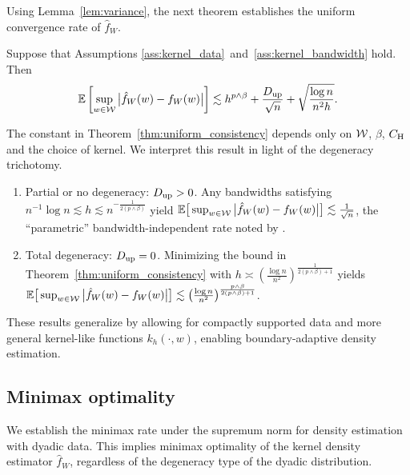 Using Lemma~\ref{lem:variance},
the next theorem establishes the uniform
convergence rate of $\hat{f}_W$.
%
\begin{theorem}%
  \label{thm:uniform_consistency}%
  Suppose that Assumptions
  \ref{ass:kernel_data}~and~\ref{ass:kernel_bandwidth}
  hold. Then
  \begin{align*}
    \mathbb{E}\left[
      \sup_{w \in \mathcal{W}}
      \big|\hat{f}_W(w) - f_W(w)\big|
    \right]
    \lesssim
    h^{p\wedge\beta}
    + \frac{D_{\textup{up}}}{\sqrt n}
    + \sqrt{\frac{\log n}{n^2h}}.
  \end{align*}
\end{theorem}
%
The constant in Theorem~\ref{thm:uniform_consistency}
depends only on $\mathcal{W}$, $\beta$, $C_{\mathrm{H}}$
and the choice of kernel.
We interpret this result in light of the degeneracy trichotomy.
\begin{enumerate}[label=(\roman*)]\onehalfspacing
  \item Partial or no degeneracy:
    $D_{\textup{up}} > 0$.
    Any bandwidths satisfying
    $n^{-1} \log n \lesssim h \lesssim n^{-\frac{1}{2(p\wedge\beta)}}$
    yield
    $\mathbb{E}\big[\sup_{w \in \mathcal{W}}\big|\hat f_W(w)
    - f_W(w)\big| \big] \lesssim \frac{1}{\sqrt n}$,
    the ``parametric'' bandwidth-independent rate noted by
    \citet{graham2022kernel}.

  \item Total degeneracy:
    $D_{\textup{up}} = 0$.
    Minimizing the bound in
    Theorem~\ref{thm:uniform_consistency} with
    $h \asymp \left( \frac{\log n}{n^2} \right)^{\frac{1}{2(p\wedge\beta)+1}}$
    yields
    $\mathbb{E}\big[ \sup_{w \in \mathcal{W}} \big|\hat f_W(w) - f_W(w)\big| \big]
    \lesssim
    \big(\frac{\log n}{n^2} \big)^{\frac{p\wedge\beta}{2(p\wedge\beta)+1}}$.
\end{enumerate}

These results generalize \citet*[Theorem~1]{chiang2020empirical}
by allowing for compactly supported data and more general kernel-like
functions $k_h(\cdot,w)$, enabling boundary-adaptive density estimation.

\subsection{Minimax optimality}

We establish the minimax rate under the
supremum norm for density estimation
with dyadic data.
This implies minimax optimality of the kernel density estimator $\hat
f_W$, regardless of the degeneracy type of the dyadic distribution.

